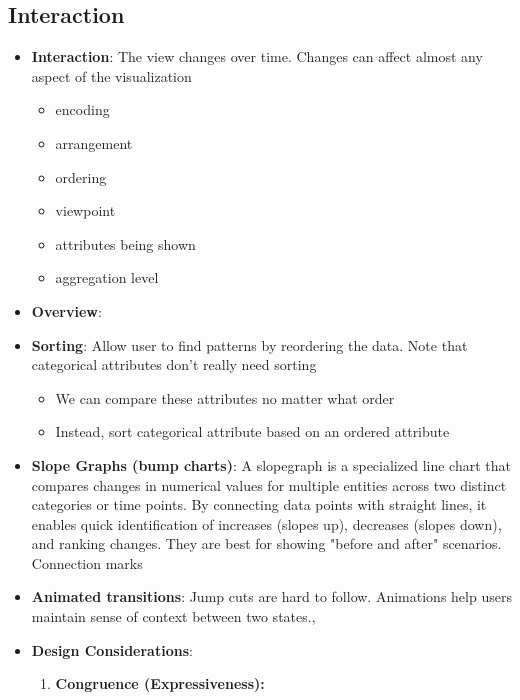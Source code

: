 \documentclass{report}
\begin{document}
    \pagebreak 
    \subsection{Interaction}
    \begin{itemize}
        \item \textbf{Interaction}: The view changes over time. Changes can affect almost any aspect of the visualization
            \begin{itemize}
                \item encoding
                \item arrangement
                \item ordering
                \item viewpoint
                \item attributes being shown
                \item aggregation level
            \end{itemize}
        \item \textbf{Overview}: 
            \bigbreak \noindent 
        \item \textbf{Sorting}: Allow user to find patterns by reordering the data. Note that categorical attributes don't really need sorting
            \begin{itemize}
                \item We can compare these attributes no matter what order
                \item Instead, sort categorical attribute based on an ordered attribute
            \end{itemize}
        \item \textbf{Slope Graphs (bump charts)}: A slopegraph is a specialized line chart that compares changes in numerical values for multiple entities across two distinct categories or time points. By connecting data points with straight lines, it enables quick identification of increases (slopes up), decreases (slopes down), and ranking changes. They are best for showing "before and after" scenarios. Connection marks
        \item \textbf{Animated transitions}: Jump cuts are hard to follow. Animations help users maintain sense of context between two states.,
        \item \textbf{Design Considerations}: 
            \begin{enumerate}
                \item \textbf{Congruence (Expressiveness):}

\end{enumerate}
\end{itemize}
\end{document}
